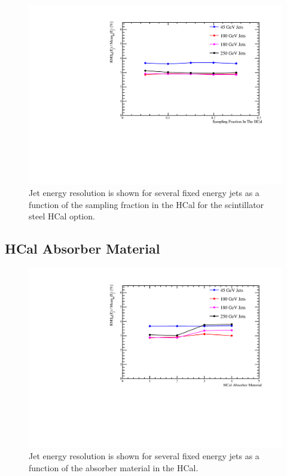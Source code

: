 \begin{figure}
  \includegraphics[width=\largefigwidth]{OptimisationStudies/Plots/JER_vs_SamplingFractionInTheHCal.pdf}
  \caption[Jet energy resolution as a function of the sampling fraction in the HCal for the scintillator steel HCal option.]{Jet energy resolution is shown for several fixed energy jets as a function of the sampling fraction in the HCal for the scintillator steel HCal option.}
  \label{optstud:fig:hcalsampfrac}
\end{figure}

\subsection{HCal Absorber Material}
\label{optstud:sec:hcal:absmat}

\begin{figure}
  \includegraphics[width=\largefigwidth]{OptimisationStudies/Plots/JER_vs_HCalAbsorberMaterial.pdf}
  \caption[Jet energy resolution as a function of the absorber matieral in the HCal.]{Jet energy resolution is shown for several fixed energy jets as a function of the absorber material in the HCal.}
  \label{optstud:fig:hcalabsmat}
\end{figure}

